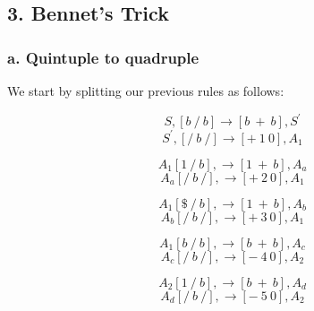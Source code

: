 \documentclass[12pt]{report}
\begin{document}
  \subsection*{3. Bennet's Trick}
    \subsubsection*{a. Quintuple to quadruple}
      We start by splitting our previous rules as follows:

      \begin{equation}
        S,[b\ /\ b] \rightarrow [b\ +\ b], S^{\prime} \label{eq:rule_1_1}
      \end{equation}
      \begin{equation}
        S^{\prime},[/\ b\ /] \rightarrow [+\ 1\ 0], A_1 \label{eq:rule_1_2}
      \end{equation}

      \begin{equation}
        A_1 [1\ /\ b], \rightarrow  [1\ +\ b], A_a  \label{eq:rule_2_1}
      \end{equation}
      \begin{equation}
        A_a [/\ b\ /], \rightarrow  [+\ 2\ 0], A_1  \label{eq:rule_2_2}
      \end{equation}

      \begin{equation}
        A_1 [\$\ /\ b], \rightarrow  [1\ +\ b], A_b  \label{eq:rule_3_1}
      \end{equation}
      \begin{equation}
        A_b [/\ b\ /], \rightarrow  [+\ 3\ 0], A_1  \label{eq:rule_3_2}
      \end{equation}

      \begin{equation}
        A_1 [b\ /\ b], \rightarrow  [b\ +\ b], A_c  \label{eq:rule_3_1}
      \end{equation}
      \begin{equation}
        A_c [/\ b\ /], \rightarrow  [-\ 4\ 0], A_2  \label{eq:rule_3_2}
      \end{equation}


      \begin{equation}
        A_2 [1\ /\ b], \rightarrow  [b\ +\ b], A_d  \label{eq:rule_4_1}
      \end{equation}
      \begin{equation}
        A_d [/\ b\ /], \rightarrow  [-\ 5\ 0], A_2  \label{eq:rule_4_2}
      \end{equation}
\end{document}
